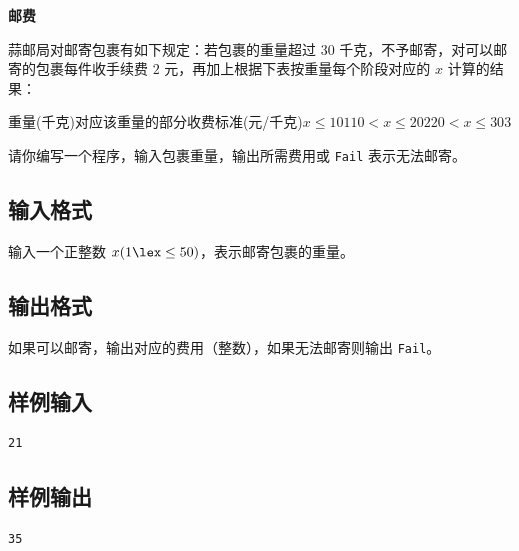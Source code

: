 \documentclass{article}
\newcommand{\problemname}[1]{\begin{center}\Large\bfseries #1\end{center}}
\begin{document}
\problemname{邮费}

蒜邮局对邮寄包裹有如下规定：若包裹的重量超过 $30$ 千克，不予邮寄，对可以邮寄的包裹每件收手续费 $2$ 元，再加上根据下表按重量每个阶段对应的 $x$ 计算的结果：

重量(千克)对应该重量的部分收费标准(元/千克)$x\le10$$1$$10<x\le20$$2$$20<x\le30$$3$

请你编写一个程序，输入包裹重量，输出所需费用或 \texttt{Fail} 表示无法邮寄。

\subsection*{输入格式}
输入一个正整数 $x(1\lex\le50)$，表示邮寄包裹的重量。

\subsection*{输出格式}
如果可以邮寄，输出对应的费用（整数），如果无法邮寄则输出 \texttt{Fail}。

\subsection*{样例输入}
\begin{verbatim}
21
\end{verbatim}

\subsection*{样例输出}
\begin{verbatim}
35
\end{verbatim}
\end{document}
